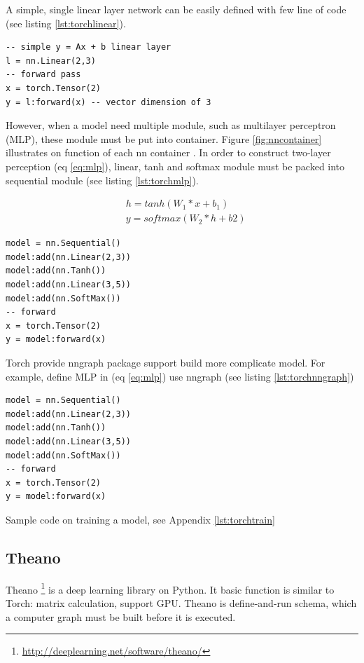 A simple, single linear layer network can be easily defined with few line of code (see listing \ref{lst:torchlinear}).

\begin{lstlisting}[caption={Simple linear layer in Torch},label={lst:torchlinear}, language={[5.1]Lua}]
-- simple y = Ax + b linear layer
l = nn.Linear(2,3)
-- forward pass
x = torch.Tensor(2)
y = l:forward(x) -- vector dimension of 3
\end{lstlisting}

However, when a model need multiple module, such as multilayer perceptron (MLP), these module must be put into container. Figure \ref{fig:nncontainer} illustrates on function of each nn container . In order to construct two-layer perception (eq \ref{eq:mlp}), linear, tanh and softmax module must be packed into sequential module (see listing \ref{lst:torchmlp}).

\begin{equation}
\label{eq:mlp}
\begin{aligned}
&h = tanh(W_1*x + b_1) \\
&y = softmax(W_2*h + b2)
\end{aligned}
\end{equation}


\begin{lstlisting}[caption={MLP in Torch},label={lst:torchmlp}, language={[5.1]Lua}]
model = nn.Sequential()
model:add(nn.Linear(2,3))
model:add(nn.Tanh())
model:add(nn.Linear(3,5))
model:add(nn.SoftMax())
-- forward
x = torch.Tensor(2)
y = model:forward(x)
\end{lstlisting}

Torch provide nngraph package support build more complicate model. For example, define MLP in (eq \ref{eq:mlp}) use nngraph (see listing \ref{lst:torchnngraph})

\begin{lstlisting}[caption={MLP using nngraph},label={lst:torchnngraph}, language={[5.1]Lua}]
model = nn.Sequential()
model:add(nn.Linear(2,3))
model:add(nn.Tanh())
model:add(nn.Linear(3,5))
model:add(nn.SoftMax())
-- forward
x = torch.Tensor(2)
y = model:forward(x)
\end{lstlisting}

Sample code on training a model, see Appendix \ref{lst:torchtrain}

\subsection{Theano}
Theano \footnote{\url{http://deeplearning.net/software/theano/}} is a deep learning library on Python. It basic function is similar to Torch: matrix calculation, support GPU. Theano is define-and-run schema, which a computer graph must be built before it is executed.

